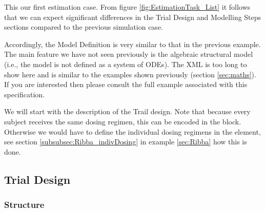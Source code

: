 This our first estimation case. From figure \ref{fig:EstimationTask_List} 
it follows that we can expect significant differences in the Trial Design and Modelling Steps
sections compared to the previous simulation case.


Accordingly, the Model Definition is very similar to that in the
previous example.  The main \pharmml feature we have not seen
previously is the algebraic structural model (i.e., the model is not
defined as a system of ODEs). The XML is too long to show here and is
similar to the examples shown previously (section \ref{sec:maths}). If
you are interested then please consult the full example associated
with this specification.

We will start with the description of the Trail design. Note that because
every subject receives the same dosing regimen, this can be encoded 
in the  block. Otherwise we would have to define the 
individual dosing regimens in the  element, see
section \ref{subsubsec:Ribba_indivDosing} in example \ref{sec:Ribba} how
this is done.



\subsection{Trial Design}
\label{eg4_subsec:trialDesign}
\subsubsection{Structure}

